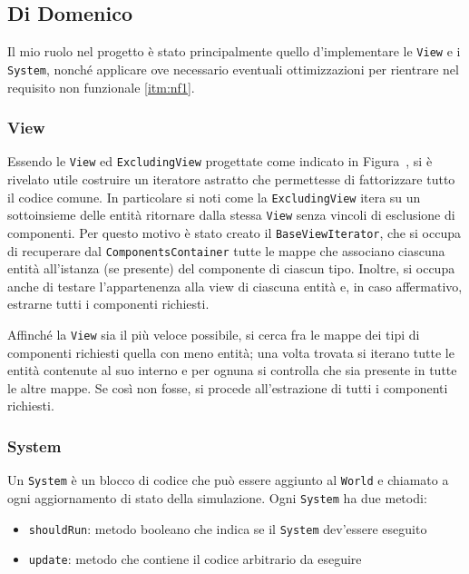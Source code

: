 \subsection{Di Domenico}\label{subsec:nicolò-di-domenico}

Il mio ruolo nel progetto è stato principalmente quello d'implementare le \texttt{View} e i \texttt{System}, nonché
applicare ove necessario eventuali ottimizzazioni per rientrare nel requisito non funzionale \ref{itm:nf1}.

\subsubsection{View}

Essendo le \texttt{View} ed \texttt{ExcludingView} progettate come indicato in Figura~, si è rivelato utile costruire un
iteratore astratto che permettesse di fattorizzare tutto il codice comune.
In particolare si noti come la \texttt{ExcludingView} itera su un sottoinsieme delle entità ritornare dalla stessa
\texttt{View} senza vincoli di esclusione di componenti.
Per questo motivo è stato creato il \texttt{BaseViewIterator}, che si occupa di recuperare dal
\texttt{ComponentsContainer} tutte le mappe che associano ciascuna entità all'istanza (se presente) del componente di
ciascun tipo.
Inoltre, si occupa anche di testare l'appartenenza alla view di ciascuna entità e, in caso affermativo, estrarne tutti i
componenti richiesti.

Affinché la \texttt{View} sia il più veloce possibile, si cerca fra le mappe dei tipi di componenti richiesti quella con
meno entità;
una volta trovata si iterano tutte le entità contenute al suo interno e per ognuna si controlla che sia presente in
tutte le altre mappe.
Se così non fosse, si procede all'estrazione di tutti i componenti richiesti.

\subsubsection{System}

Un \texttt{System} è un blocco di codice che può essere aggiunto al \texttt{World} e chiamato a ogni aggiornamento di
stato della simulazione.
Ogni \texttt{System} ha due metodi:
\begin{itemize}
    \item \texttt{shouldRun}: metodo booleano che indica se il \texttt{System} dev'essere eseguito
    \item \texttt{update}: metodo che contiene il codice arbitrario da eseguire
\end{itemize}

